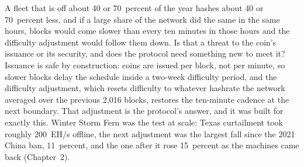 A fleet that is off about 40 or 70~percent of the year hashes about 40 or 70~percent less, and if a large share of the network did the same in the same hours, blocks would come slower than every ten minutes in those hours and the difficulty adjustment would follow them down. Is that a threat to the coin's issuance or its security, and does the protocol need something new to meet it? Issuance is safe by construction: coins are issued per block, not per minute, so slower blocks delay the schedule inside a two-week difficulty period, and the difficulty adjustment, which resets difficulty to whatever hashrate the network averaged over the previous 2,016 blocks, restores the ten-minute cadence at the next boundary. That adjustment is the protocol's answer, and it was built for exactly this. Winter Storm Fern was the test at scale: Texas curtailment took roughly 200~EH/s offline, the next adjustment was the largest fall since the 2021 China ban, 11~percent, and the one after it rose 15~percent as the machines came back (Chapter~2). %
